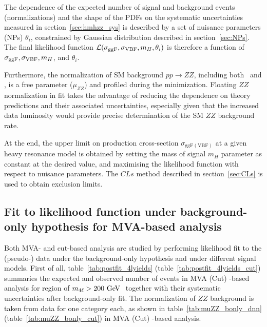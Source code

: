The dependence of the expected number of signal and background events (normalizations) and the shape of the PDFs on the systematic uncertainties measured in section~\ref{sec:hmhzz_sys} 
is described by a set of nuisance parameters (NPs) $\theta_{i}$, constrained by Gaussian distribution described in section~\ref{sec:NPs}.
The final likelihood function ${\cal L } ( \sigma_{\mathrm{ggF}}, \sigma_{\mathrm{VBF}},m_{H},\theta_{i})$ is therefore a function of $\sigma_{\mathrm{ggF}}, \sigma_{\mathrm{VBF}} , m_{H}$, and $\theta_{i}$.

Furthermore, the normalization of SM background $pp\to ZZ$, including both \qqZZ\ and \ggZZ, is a free parameter ($\mu_{ZZ}$) and profiled during the minimization.
Floating $ZZ$ normalization in fit takes the advantage of reducing the dependence on theory predictions and their associated uncertainties,
especially given that the increased data luminosity would provide precise determination of the SM $ZZ$ background rate.

At the end, the upper limit on production cross-section $\sigma_{\mathrm{ggF(VBF)}}$ at a given heavy resonance model is obtained by setting the mass of signal $m_{H}$ parameter as constant at the desired value,
and maximising the likelihood function with respect to nuisance parameters.
The $CLs$ method described in section~\ref{sec:CLs} is used to obtain exclusion limits.

\subsection{Fit to likelihood function under background-only hypothesis for MVA-based analysis}

Both MVA- and cut-based analysis are studied by performing likelihood fit to the (pseudo-) data under the background-only hypothesis and under different signal models.
First of all, table~\ref{tab:postfit_4lyields} (table~\ref{tab:postfit_4lyields_cut}) summaries the expected and observed number of events in MVA (Cut) -based analysis for region of $m_{4\ell} > 200~\text{Ge\kern -0.1em V}~$ together with their systematic uncertainties after background-only fit.
The normalization of $ZZ$ background is taken from data for one category each, as shown in table~\ref{tab:muZZ_bonly_dnn} (table~\ref{tab:muZZ_bonly_cut}) in MVA (Cut) -based analysis.

